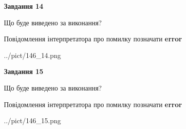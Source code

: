 \documentclass[11pt, ukrainian]{article}
\begin{document}
{\begin {large}
{\begin {center}\textbf{Завдання 14}\end {center}}\par
Що буде виведено за виконання? \par
Повідомлення інтерпретатора про помилку позначати \textbf{error}

\begin{center}
	{../pict/146_14.png}
\end{center}
\newpage

{\begin {center}\textbf{Завдання 15}\end {center}}\par
Що буде виведено за виконання? \par
Повідомлення інтерпретатора про помилку позначати \textbf{error}

\begin{center}
	{../pict/146_15.png}
\end{center}
\newpage

\end {large}}
\end{document}
